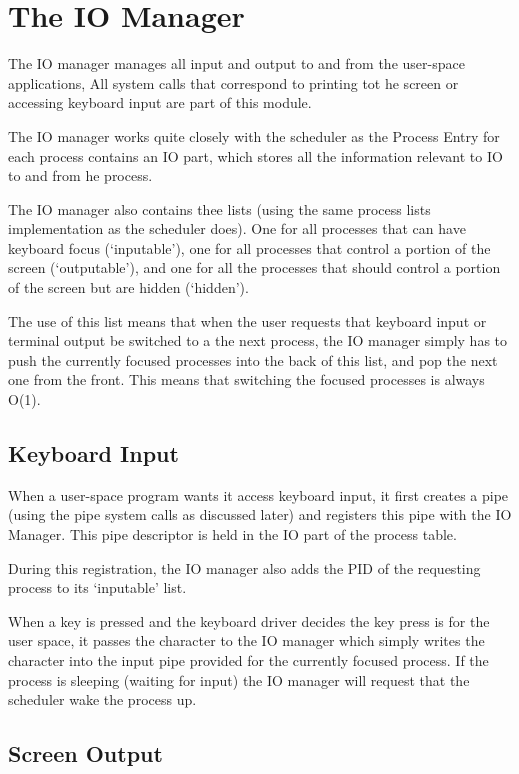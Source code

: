 \documentclass[a4paper]{report}
\begin{document}
\clearpage

\section{The IO Manager}

The IO manager manages all input and output to and from the user-space applications, All system calls that correspond to printing tot he screen or accessing keyboard input are part of this module.

The IO manager works quite closely with the scheduler as the Process Entry for each process contains an IO part, which stores all the information relevant to IO to and from he process.

The IO manager also contains thee lists (using the same process lists implementation as the scheduler does). One for all processes that can have keyboard focus (`inputable'), one for all processes that control a portion of the screen (`outputable'), and one for all the processes that should control a portion of the screen but are hidden (`hidden').

The use of this list means that when the user requests that keyboard input or terminal output be switched to a the next process, the IO manager simply has to push the currently focused processes into the back of this list, and pop the next one from the front. This means that switching the focused processes is always O(1).

\subsection{Keyboard Input}

When a user-space program wants it access keyboard input, it first creates a pipe (using the pipe system calls as discussed later) and registers this pipe with the IO Manager. This pipe descriptor is held in the IO part of the process table.

During this registration, the IO manager also adds the PID of the requesting process to its `inputable' list.

When a key is pressed and the keyboard driver decides the key press is for the user space, it passes the character to the IO manager which simply writes the character into the input pipe provided for the currently focused process. If the process is sleeping (waiting for input) the IO manager will request that the scheduler wake the process up.

\subsection{Screen Output}
\end{document}
